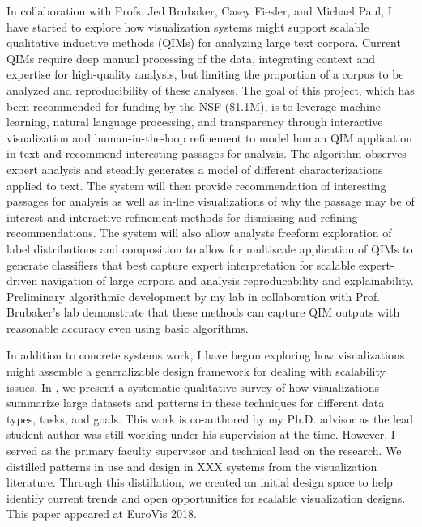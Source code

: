 \documentclass[11pt]{article}
\begin{document}
In collaboration with Profs. Jed Brubaker, Casey Fiesler, and Michael Paul, I have started to explore how visualization systems might support scalable qualitative inductive methods (QIMs) for analyzing large text corpora. Current QIMs require deep manual processing of the data, integrating context and expertise for high-quality analysis, but limiting the proportion of a corpus to be analyzed and reproducibility of these analyses. The goal of this project, which has been recommended for funding by the NSF (\$1.1M), is to leverage machine learning, natural language processing, and transparency through interactive visualization and human-in-the-loop refinement to model human QIM application in text and recommend interesting passages for analysis. The algorithm observes expert analysis and steadily generates a model of different characterizations applied to text. The system will then provide recommendation of interesting passages for analysis as well as in-line visualizations of why the passage may be of interest and interactive refinement methods for dismissing and refining recommendations. The system will also allow analysts freeform exploration of label distributions and composition to allow for multiscale application of QIMs to generate classifiers that best capture expert interpretation for scalable expert-driven navigation of large corpora and analysis reproducability and explainability. Preliminary algorithmic development by my lab in collaboration with Prof. Brubaker's lab demonstrate that these methods can capture QIM outputs with reasonable accuracy even using basic algorithms. 

In addition to concrete systems work, I have begun exploring how visualizations might assemble a generalizable design framework for dealing with scalability issues. In \cite{sarikayadesign}, we present a systematic qualitative survey of how visualizations summarize large datasets and patterns in these techniques for different data types, tasks, and goals. This work is co-authored by my Ph.D. advisor as the lead student author was still working under his supervision at the time. However, I served as the primary faculty supervisor and technical lead on the research. We distilled patterns in use and design in XXX systems from the visualization literature. Through this distillation, we created an initial design space to help identify current trends and open opportunities for scalable visualization designs. This paper appeared at EuroVis 2018. 
\end{document}
